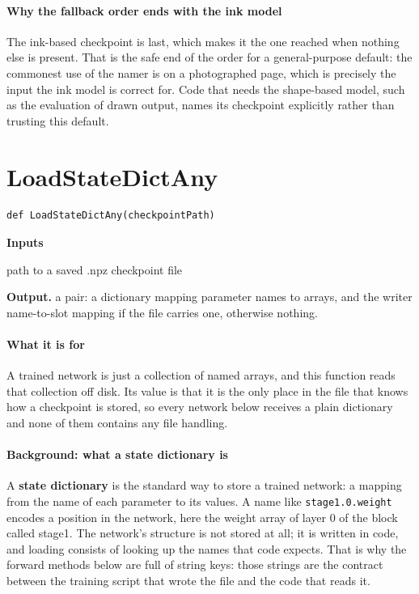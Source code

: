 \paragraph{Why the fallback order ends with the ink model}
The ink-based checkpoint is last, which makes it the one reached when nothing else is present. That is the safe end of the order for a general-purpose default: the commonest use of the namer is on a photographed page, which is precisely the input the ink model is correct for. Code that needs the shape-based model, such as the evaluation of drawn output, names its checkpoint explicitly rather than trusting this default.


\section{LoadStateDictAny}
\begin{lstlisting}[style=sig]
def LoadStateDictAny(checkpointPath)
\end{lstlisting}

\noindent\textbf{Inputs}
\begin{description}[leftmargin=2.2em,style=nextline,font=\normalfont\ttfamily]\setlength\itemsep{1pt}
  \item[{checkpointPath}] \normalfont path to a saved .npz checkpoint file
\end{description}

\noindent\textbf{Output.} a pair: a dictionary mapping parameter names to arrays, and the writer name-to-slot mapping if the file carries one, otherwise nothing.


\paragraph{What it is for}
A trained network is just a collection of named arrays, and this function reads that collection off disk. Its value is that it is the only place in the file that knows how a checkpoint is stored, so every network below receives a plain dictionary and none of them contains any file handling.


\paragraph{Background: what a state dictionary is}
A \textbf{state dictionary} is the standard way to store a trained network: a mapping from the name of each parameter to its values. A name like \texttt{stage1.0.weight} encodes a position in the network, here the weight array of layer 0 of the block called stage1. The network's structure is not stored at all; it is written in code, and loading consists of looking up the names that code expects. That is why the forward methods below are full of string keys: those strings are the contract between the training script that wrote the file and the code that reads it.


